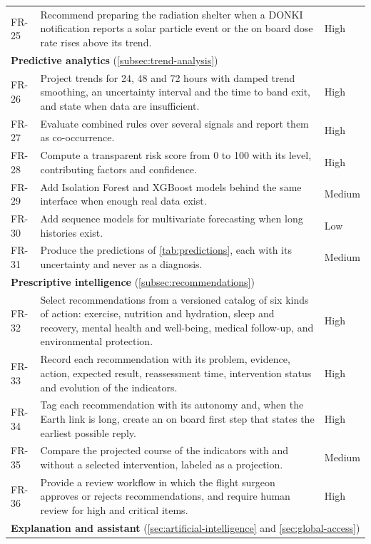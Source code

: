 {\begin{longtable}{p{1.5cm}p{10.8cm}p{1.5cm}}
FR-25 & Recommend preparing the radiation shelter when a DONKI notification reports a solar particle event or the on board dose rate rises above its trend. & High \\
\multicolumn{3}{l}{\textbf{Predictive analytics} (\ref{subsec:trend-analysis})} \\
FR-26 & Project trends for 24, 48 and 72 hours with damped trend smoothing, an uncertainty interval and the time to band exit, and state when data are insufficient. & High \\
FR-27 & Evaluate combined rules over several signals and report them as co-occurrence. & High \\
FR-28 & Compute a transparent risk score from 0 to 100 with its level, contributing factors and confidence. & High \\
FR-29 & Add Isolation Forest and XGBoost models behind the same interface when enough real data exist. & Medium \\
FR-30 & Add sequence models for multivariate forecasting when long histories exist. & Low \\
FR-31 & Produce the predictions of \ref{tab:predictions}, each with its uncertainty and never as a diagnosis. & Medium \\
\multicolumn{3}{l}{\textbf{Prescriptive intelligence} (\ref{subsec:recommendations})} \\
FR-32 & Select recommendations from a versioned catalog of six kinds of action: exercise, nutrition and hydration, sleep and recovery, mental health and well-being, medical follow-up, and environmental protection. & High \\
FR-33 & Record each recommendation with its problem, evidence, action, expected result, reassessment time, intervention status and evolution of the indicators. & High \\
FR-34 & Tag each recommendation with its autonomy and, when the Earth link is long, create an on board first step that states the earliest possible reply. & High \\
FR-35 & Compare the projected course of the indicators with and without a selected intervention, labeled as a projection. & Medium \\
FR-36 & Provide a review workflow in which the flight surgeon approves or rejects recommendations, and require human review for high and critical items. & High \\
\multicolumn{3}{l}{\textbf{Explanation and assistant} (\ref{sec:artificial-intelligence} and \ref{sec:global-access})} \\

\end{longtable}}
